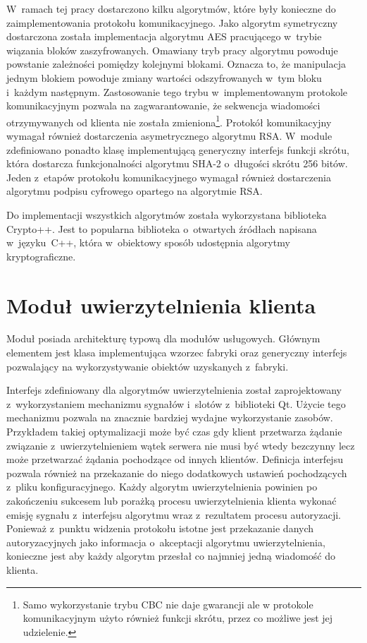 W~ramach tej pracy dostarczono kilku algorytmów, które były konieczne
do zaimplementowania protokołu komunikacyjnego. Jako algorytm
symetryczny dostarczona została implementacja algorytmu AES
pracującego w~trybie wiązania bloków zaszyfrowanych. Omawiany tryb
pracy algorytmu powoduje powstanie zależności pomiędzy kolejnymi
blokami. Oznacza to, że manipulacja jednym blokiem powoduje zmiany
wartości odszyfrowanych w~tym bloku i~każdym następnym. Zastosowanie
tego trybu w~implementowanym protokole komunikacyjnym pozwala na
zagwarantowanie, że sekwencja wiadomości otrzymywanych od klienta nie
została zmieniona\footnote{Samo wykorzystanie trybu CBC nie daje
  gwarancji ale w protokole komunikacyjnym użyto również
  funkcji skrótu, przez co możliwe jest jej udzielenie.}. Protokół
komunikacyjny wymagał również dostarczenia asymetrycznego algorytmu
RSA. W~module zdefiniowano ponadto klasę implementującą generyczny
interfejs funkcji skrótu, która dostarcza funkcjonalności algorytmu
SHA-2 o~długości skrótu 256 bitów. Jeden z~etapów protokołu
komunikacyjnego wymagał również dostarczenia algorytmu podpisu
cyfrowego opartego na algorytmie RSA.

Do implementacji wszystkich algorytmów została wykorzystana biblioteka
Crypto++. Jest to popularna biblioteka o~otwartych źródłach napisana
w~języku~C++, która w~obiektowy sposób udostępnia algorytmy
kryptograficzne.

\section[Moduł uwierzytelnienia][Moduł uwierzytelnienia klienta]{Moduł uwierzytelnienia klienta}

Moduł posiada architekturę typową dla modułów usługowych. Głównym
elementem jest klasa implementująca wzorzec fabryki oraz generyczny
interfejs pozwalający na wykorzystywanie obiektów uzyskanych
z~fabryki.

Interfejs zdefiniowany dla algorytmów uwierzytelnienia został
zaprojektowany z~wykorzystaniem mechanizmu sygnałów i~slotów
z~biblioteki Qt. Użycie tego mechanizmu pozwala na znacznie bardziej
wydajne wykorzystanie zasobów. Przykładem takiej optymalizacji może
być czas gdy klient przetwarza żądanie związanie z~uwierzytelnieniem
wątek serwera nie musi być wtedy bezczynny lecz może przetwarzać
żądania pochodzące od innych klientów. Definicja interfejsu pozwala
również na przekazanie do niego dodatkowych ustawień pochodzących
z~pliku konfiguracyjnego. Każdy algorytm uwierzytelnienia powinien po
zakończeniu sukcesem lub porażką procesu uwierzytelnienia klienta
wykonać emisję sygnału z~interfejsu algorytmu wraz z~rezultatem
procesu autoryzacji. Ponieważ z~punktu widzenia protokołu istotne jest
przekazanie danych autoryzacyjnych jako informacja o~akceptacji
algorytmu uwierzytelnienia, konieczne jest aby każdy algorytm przesłał
co najmniej jedną wiadomość do klienta.

